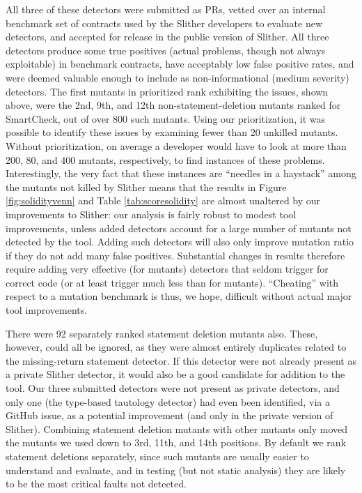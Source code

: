 All three of these detectors were submitted as PRs, vetted over an internal benchmark set of contracts used by the Slither developers to evaluate new detectors, and accepted for release in the public version of Slither.  All three detectors produce some true positives (actual problems, though not always exploitable) in benchmark contracts, have acceptably low false positive rates, and were deemed valuable enough to include as non-informational (medium severity) detectors.  The first mutants in prioritized rank exhibiting the issues, shown above, were the 2nd, 9th, and 12th non-statement-deletion mutants ranked for SmartCheck, out of over 800 such mutants.  Using our prioritization, it was possible to identify these issues by examining fewer than 20 unkilled mutants.  Without prioritization, on average a developer would have to look at more than 200, 80, and 400 mutants, respectively, to find instances of these problems.  Interestingly, the very fact that these instances are ``needles in a haystack'' among the mutants not killed by Slither means that the results in Figure \ref{fig:solidityvenn} and Table \ref{tab:scoresolidity} are almost unaltered by our improvements to Slither: our analysis is fairly robust to modest tool improvements, unless added detectors account for a large number of mutants not detected by the tool.  Adding such detectors will also only improve mutation ratio if they do not add many false positives.  Substantial changes in results therefore require adding very effective (for mutants) detectors that seldom trigger for correct code (or at least trigger much less than for mutants).  ``Cheating'' with respect to a mutation benchmark is thus, we hope, difficult without actual major tool improvements.

There were 92 separately ranked statement deletion mutants also.  These, however, could all be ignored, as they were almost entirely duplicates related to the missing-return statement detector.  If this detector were not already present as a private Slither detector, it would also be a good candidate for addition to the tool.  Our three submitted detectors were not present as private detectors, and only one (the type-based tautology detector) had even been identified, via a GitHub issue, as a potential improvement (and only in the private version of Slither).  Combining statement deletion mutants with other mutants only moved the mutants we used down to 3rd, 11th, and 14th positions.  By default we rank statement deletions separately, since such mutants are usually easier to understand and evaluate, and in testing (but not static analysis) they are likely to be the most critical faults not detected.

